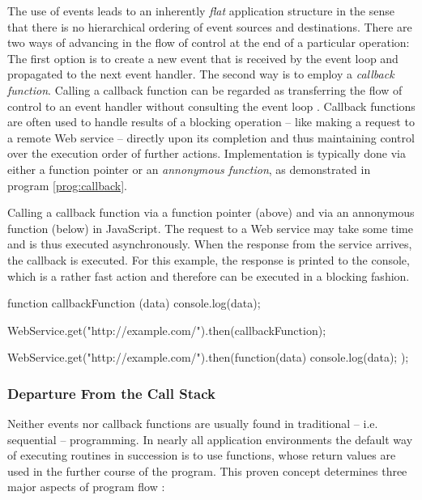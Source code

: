 The use of events leads to an inherently \textit{flat} application structure in the sense that there is no hierarchical ordering of event sources and destinations. There are two ways of advancing in the flow of control at the end of a particular operation: The first option is to create a new event that is received by the event loop and propagated to the next event handler. The second way is to employ a \textit{callback function}. Calling a callback function can be regarded as transferring the flow of control to an event handler without consulting the event loop \cite[p. 92]{Erb2012}. Callback functions are often used to handle results of a blocking operation -- like making a request to a remote Web service -- directly upon its completion and thus maintaining control over the execution order of further actions. Implementation is typically done via either a function pointer or an \textit{annonymous function}, as demonstrated in program \ref{prog:callback}.

\begin{program}
  \caption{Calling a callback function via a function pointer (above) and via an annonymous function (below) in JavaScript. The request to a Web service may take some time and is thus executed asynchronously. When the response from the service arrives, the callback is executed. For this example, the response is printed to the console, which is a rather fast action and therefore can be executed in a blocking fashion.}
  \label{prog:callback}
  \begin{JavaCode}
function callbackFunction (data) {
    console.log(data);
}
  
WebService.get("http://example.com/").then(callbackFunction);
  \end{JavaCode}
\begin{JavaCode}
WebService.get("http://example.com/").then(function(data) {
    console.log(data);
});
  \end{JavaCode}
\end{program}

\subsubsection*{Departure From the Call Stack}
\label{lab:stack}
Neither events nor callback functions are usually found in traditional -- i.e. sequential -- programming. In nearly all application environments the default way of executing routines in succession is to use functions, whose return values are used in the further course of the program. This proven concept determines three major aspects of program flow \cite[p. 3]{Hohpe2006}:

